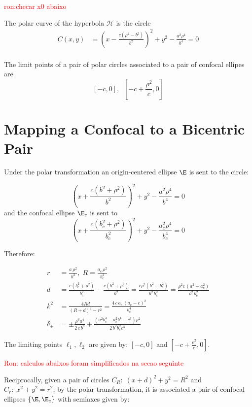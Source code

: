 \textcolor{red}{ron:checar x0 abaixo}
\begin{lemma}
The polar curve of the hyperbola $\mathcal{H}$ is the circle
\begin{align*}
   C(x,y)&= \left(x- \frac{c(\rho^2 - b^2)}{b^2} \right)^2+y^2-\frac{a^2\rho^4}{b^4}=0\\
\end{align*}  
\end{lemma}

\begin{lemma}
The limit points of a pair of polar circles associated to a pair of confocal ellipes are
\[ \left[-c,0\right], \;\; \left[-c+\frac{\rho^2}{c} ,0\right]\]

\end{lemma}
\section{Mapping a Confocal to a Bicentric Pair}

Under the polar transformation an origin-centered ellipse $\E$ is sent to the circle:

\[ \left( x+{\frac {c \left( {b}^{2}+\rho^{2} \right) }{{b}^{2}}}
 \right) ^{2}+{y}^{2}-{\frac {{a}^{2}\rho^{4}}{{b}^4}}=0\]
 and the confocal ellipse $\E_c$ is sent to
 \[ \left( x+\frac {c \left( b_c^{2}+\rho^{2} \right) }{b_c^2}
 \right) ^{2}+{y}^{2}-{\frac {a_c^{2}\rho^{4}}{b_c^4}}=0\]
 
Therefore:

\begin{align*} r&=\frac{a \,\rho^2}{b^2},\; R=\frac{a_c\, \rho^2}{b_c^2}\\
d&=\frac {c \left( b_c^{2}+\rho^{2} \right) }{b_c^2}-\frac {c \left( b^{2}+\rho^{2} \right) }{b^2}=\frac{c \rho^2(b^2 - b_c^2)}{b^2\, b_c^2}=\frac{\rho^2 c\, (a^2 - a_c^2)}{b^2\, b_c^2}\\
  k^2&=\frac{4Rd}{(R+d)^2-r^2}=\frac{4 \,c\, a_c\,(a_c - c)^2    }{b_c^4}\\
  \delta_{\pm}&=\pm {\frac {\rho^{6}{a}^{4}}{2\,c\, {b}^{8}}}+{\frac { \left( {a}^{2} b_c^{4}-a_c^{2}{b}^{4}-{c}^{6} \right) \rho^{2}}{2\,{b}^{2}  b_c^{2} {c}^{3}}}
\end{align*}

 The limiting points $\ell_1,\ell_2$ are given by: $[-c,0]$ and $[-c+\frac{\rho^2}{c},0]$.
 
 
 \textcolor{red}{Ron: calculos abaixos foram simplificados na secao seguinte}
 
 
 Reciprocally, given a pair of circles $C_R:\; (x+d)^2+y^2=R^2$ and $C_r:\; x^2+y^2=r^2$, by the  polar transformation, 
 it is associated a pair of confocal ellipses $\{\E, \E_c\}$
 with semiaxes given by:
 
